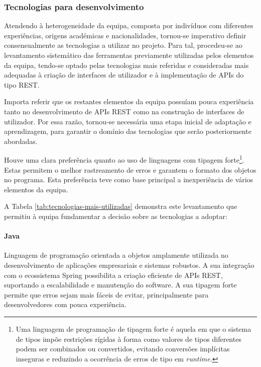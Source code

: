 \subsubsection{Tecnologias para desenvolvimento}

Atendendo à heterogeneidade da equipa, composta por indivíduos com diferentes experiências, origens académicas e nacionalidades, tornou-se imperativo definir consensualmente as tecnologias a utilizar no projeto. Para tal, procedeu-se ao levantamento sistemático das ferramentas previamente utilizadas pelos elementos da equipa, tendo-se optado pelas tecnologias mais referidas e consideradas mais adequadas à criação de interfaces de utilizador e à implementação de APIs do tipo REST. 

Importa referir que os restantes elementos da equipa possuíam pouca experiência tanto no desenvolvimento de APIs REST como na construção de interfaces de utilizador. Por essa razão, tornou-se necessária uma etapa inicial de adaptação e aprendizagem, para garantir o domínio das tecnologias que serão posteriormente abordadas.

Houve uma clara preferência quanto ao uso de linguagens com tipagem forte\footnote{Uma linguagem de programação de tipagem forte é aquela em que o sistema de tipos impõe restrições rígidas à forma como valores de tipos diferentes podem ser combinados ou convertidos, evitando conversões implícitas inseguras e reduzindo a ocorrência de erros de tipo em \textit{runtime}.}. Estas permitem o melhor rastreamento de erros e garantem o formato dos objetos no programa. Esta preferência teve como base principal a inexperiência de vários elementos da equipa.

A Tabela \ref{tab:tecnologias-mais-utilizadas} demonstra este levantamento que permitiu à equipa fundamentar a decisão sobre as tecnologias a adoptar:





\paragraph{Java} Linguagem de programação orientada a objetos amplamente utilizada no desenvolvimento de aplicações empresariais e sistemas robustos. A sua integração com o ecossistema Spring possibilita a criação eficiente de APIs REST, suportando a escalabilidade e manutenção do software. A sua tipagem forte permite que erros sejam mais fáceis de evitar, principalmente para desenvolvedores com pouca experiência.  

